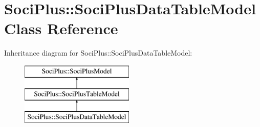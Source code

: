 \hypertarget{class_soci_plus_1_1_soci_plus_data_table_model}{\section{Soci\+Plus\+:\+:Soci\+Plus\+Data\+Table\+Model Class Reference}
\label{class_soci_plus_1_1_soci_plus_data_table_model}
}
Inheritance diagram for Soci\+Plus\+:\+:Soci\+Plus\+Data\+Table\+Model\+:\begin{figure}[H]
\begin{center}
\leavevmode
\includegraphics[height=3.000000cm]{class_soci_plus_1_1_soci_plus_data_table_model}
\end{center}
\end{figure}
